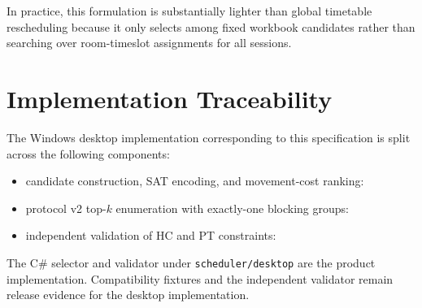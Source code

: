 \documentclass{article}
\begin{document}
In practice, this formulation is substantially lighter than global timetable rescheduling because it only selects among fixed workbook candidates rather than searching over room-timeslot assignments for all sessions.

\section{Implementation Traceability}

The Windows desktop implementation corresponding to this specification is split across the following components:
\begin{itemize}
    \item candidate construction, SAT encoding, and movement-cost ranking:
    \item protocol v2 top-$k$ enumeration with exactly-one blocking groups:
    \item independent validation of HC and PT constraints:
\end{itemize}

The C\# selector and validator under \texttt{scheduler/desktop} are the product
implementation. Compatibility fixtures and the independent validator remain
release evidence for the desktop implementation.
\end{document}
